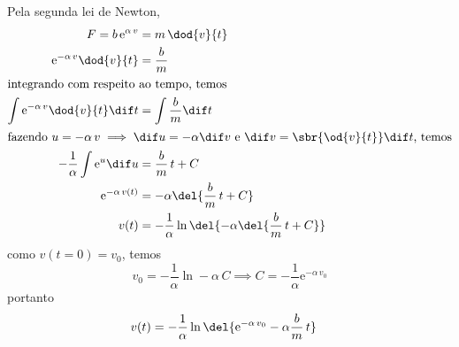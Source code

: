 \documentclass[]{IMTexam}
\begin{document}
\begin{questions}
	\begin{solution}
		Pela segunda lei de Newton,
		\begin{align*}
			F=b\,\mathrm{e}^{\alpha\,v}                 & =m\,\dod{v}{t}                                               \\
			\mathrm{e}^{-\alpha\,v}\dod{v}{t}           & =\dfrac{b}{m}                                                \\
			\intertext{integrando com respeito ao tempo, temos}
			\int\mathrm{e}^{-\alpha\,v}\dod{v}{t}\dif t & =\int\dfrac{b}{m}\dif t                                      \\
			\intertext{fazendo $ u=-\alpha\,v\implies \dif u=-\alpha\dif v $ e $ \dif v=\sbr{\od{v}{t}}\dif t $, temos}
			-\dfrac{1}{\alpha}\int\mathrm{e}^{u}\dif u  & =\dfrac{b}{m}\,t+C                                           \\
			\mathrm{e}^{-\alpha\,v(t)}                  & =-\alpha\del{\dfrac{b}{m}\,t+C}                              \\
			v(t)                                        & =-\dfrac{1}{\alpha}\ln{\del{-\alpha\del{\dfrac{b}{m}\,t+C}}}
		\end{align*}
		como $ v(t=0)=v_0 $, temos
		\[ v_0=-\dfrac{1}{\alpha}\ln -\alpha\,C\implies C=-\dfrac{1}{\alpha}\mathrm{e}^{-\alpha\,v_0} \]
		portanto
		\begin{align*}
			v(t) & =-\dfrac{1}{\alpha}\ln{\del{\mathrm{e}^{-\alpha\,v_0}-\alpha\dfrac{b}{m}\,t}}
		\end{align*}
	\end{solution}

\end{questions}
\end{document}
